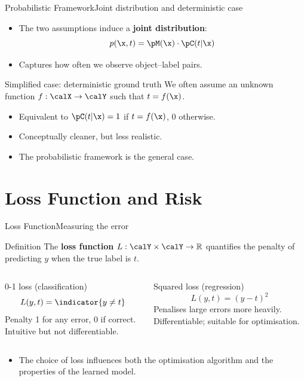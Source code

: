 \begin{frame}{Probabilistic Framework}{Joint distribution and deterministic case}
  \begin{itemize}
    \item The two assumptions induce a
          \textcolor{AccentBlue}{\textbf{joint distribution}}:
          \[
            p(\x, t) = \pM(\x) \cdot \pC(t|\x)
          \]
    \item Captures how often we observe object–label pairs.
  \end{itemize}
  \bigskip
  \begin{block}{Simplified case: deterministic ground truth}
    We often assume an unknown function $f : \calX \to \calY$ such that $t = f(\x)$.
    \begin{itemize}
      \item Equivalent to $\pC(t|\x) = 1$ if $t = f(\x)$, $0$ otherwise.
      \item Conceptually cleaner, but less realistic.
      \item The probabilistic framework is the general case.
    \end{itemize}
  \end{block}
\end{frame}

\section{Loss Function and Risk}

\begin{frame}{Loss Function}{Measuring the error}
  \begin{block}{Definition}
    The \textcolor{AccentBlue}{\textbf{loss function}} $L : \calY \times \calY \to \mathbb{R}$
    quantifies the penalty of predicting $y$ when the true label is $t$.
  \end{block}
  \bigskip
  \begin{columns}[T]
    \begin{exampleblock}{0-1 loss (classification)}
      \[
        L(y, t) = \indicator{y \neq t}
      \]
      Penalty 1 for any error, 0 if correct. Intuitive but not differentiable.
    \end{exampleblock}
    \begin{exampleblock}{Squared loss (regression)}
      \[
        L(y, t) = (y - t)^2
      \]
      Penalises large errors more heavily. Differentiable; suitable for optimisation.
    \end{exampleblock}
  \end{columns}
  \bigskip
  \begin{itemize}
    \item The choice of loss influences both the optimisation algorithm and the properties of
          the learned model.
  \end{itemize}
\end{frame}


